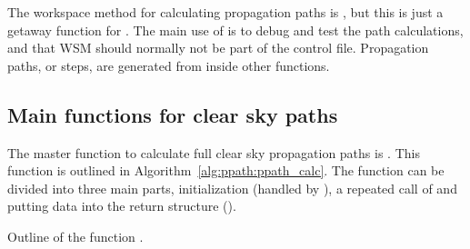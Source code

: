 The workspace method for calculating propagation paths is
, but this is just a getaway function for
. The main use of  is to
debug and test the path calculations, and that WSM should normally not
be part of the control file. Propagation paths, or steps, are
generated from inside other functions.


\subsection{Main functions for clear sky paths}

The master function to calculate full clear sky propagation paths is
. This function is outlined in
Algorithm~\ref{alg:ppath:ppath_calc}. The function can be divided into
three main parts, initialization (handled by
), a repeated call of
 and putting data into the return
structure ().

\begin{algorithm}[!t]
 \begin{algorithmic}
   \ENDIF
    \ENDIF
   \ENDIF
  \ENDWHILE
 \end{algorithmic}
 \caption{Outline of the function .}
 \label{alg:ppath:ppath_calc}
\end{algorithm}

